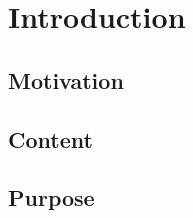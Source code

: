 \chapter{Introduction}
\label{cha:Einleitung}

\section{Motivation}

\section{Content}

\section{Purpose}


